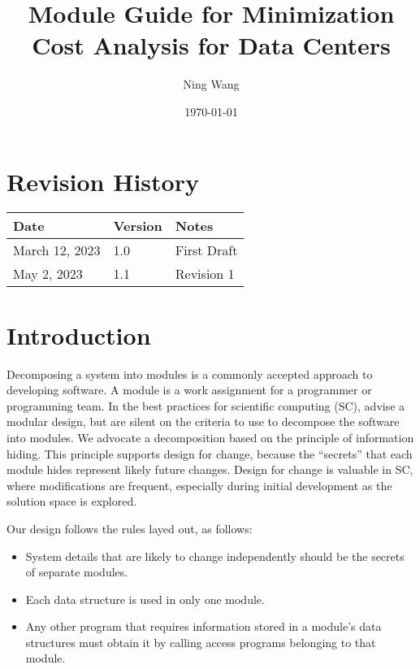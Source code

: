 \documentclass[12pt]{article}
\begin{document}
\title{Module Guide for Minimization Cost Analysis for Data Centers } 
\author{Ning Wang}
\date{\today}
	
\maketitle

\tableofcontents

\newpage

\section{Revision History}

\begin{tabularx}{\textwidth}{p{3cm}p{2cm}X}
\toprule {\bf Date} & {\bf Version} & {\bf Notes}\\
\midrule
March 12, 2023 & 1.0 & First Draft\\
May 2, 2023 & 1.1 & Revision 1\\
\bottomrule
\end{tabularx}

\newpage
\section{Introduction}

Decomposing a system into modules is a commonly accepted approach to developing
software.  A module is a work assignment for a programmer or programming
team.  In the best practices for scientific computing (SC), advise a modular design, but are silent on the criteria
to use to decompose the software into modules.  We advocate a decomposition
based on the principle of information hiding.  This
principle supports design for change, because the ``secrets'' that each module
hides represent likely future changes.  Design for change is valuable in SC,
where modifications are frequent, especially during initial development as the
solution space is explored.  

Our design follows the rules layed out, as follows:
\begin{itemize}
\item System details that are likely to change independently should be the
  secrets of separate modules.
\item Each data structure is used in only one module.
\item Any other program that requires information stored in a module's data
  structures must obtain it by calling access programs belonging to that module.
\end{itemize}
\end{document}
